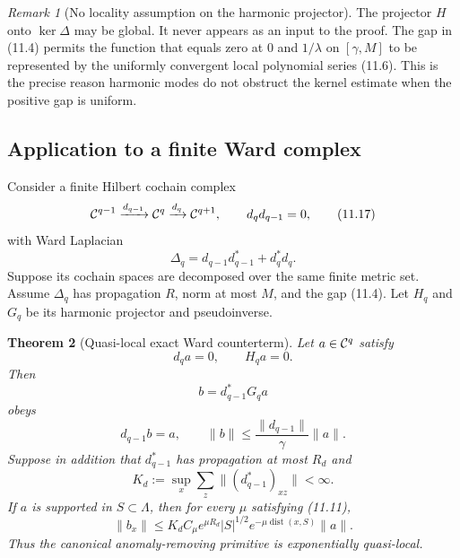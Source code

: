 \documentclass[11pt]{article}
\newtheorem{theorem}{Theorem}[section]
\theoremstyle{remark}
\newtheorem{remark}[theorem]{Remark}
\begin{document}
\begin{remark}[No locality assumption on the harmonic projector]
\label{rem:v12v11-harmonic}
The projector \(H\) onto \(\ker\Delta\) may be global.  It never
appears as an input to the proof.  The gap in (11.4) permits the
function that equals zero at \(0\) and \(1/\lambda\) on
\([\gamma,M]\) to be represented by the uniformly convergent local
polynomial series (11.6).  This is the precise reason harmonic modes
do not obstruct the kernel estimate when the positive gap is
uniform.
\end{remark}

\subsection{Application to a finite Ward complex}

Consider a finite Hilbert cochain complex
\[
 {\cal C}^{q-1}\xrightarrow{d_{q-1}}
 {\cal C}^{q}\xrightarrow{d_q}{\cal C}^{q+1},
 \qquad d_qd_{q-1}=0,                                      \tag{11.17}
\]
with Ward Laplacian
\[
 \Delta_q=d_{q-1}d_{q-1}^*+d_q^*d_q.                       \tag{11.18}
\]
Suppose its cochain spaces are decomposed over the same finite metric
set.  Assume \(\Delta_q\) has propagation \(R\), norm at most \(M\),
and the gap (11.4).  Let \(H_q\) and \(G_q\) be its harmonic
projector and pseudoinverse.

\begin{theorem}[Quasi-local exact Ward counterterm]
\label{thm:v12v11-counterterm}
Let \(a\in{\cal C}^q\) satisfy
\[
                         d_q a=0,\qquad H_q a=0.             \tag{11.19}
\]
Then
\[
                         b=d_{q-1}^*G_q a                   \tag{11.20}
\]
obeys
\[
                         d_{q-1}b=a,\qquad
 \|b\|\le\frac{\|d_{q-1}\|}{\gamma}\|a\|.                  \tag{11.21}
\]
Suppose in addition that \(d_{q-1}^*\) has propagation at most
\(R_d\) and
\[
 K_d:=\sup_x\sum_z
       \|(d_{q-1}^*)_{xz}\|<\infty.                         \tag{11.22}
\]
If \(a\) is supported in \(S\subset\Lambda\), then for every \(\mu\)
satisfying (11.11),
\[
 \boxed{
 \|b_x\|
 \le K_d C_\mu e^{\mu R_d}|S|^{1/2}
      e^{-\mu\operatorname{dist}(x,S)}\|a\|.}               \tag{11.23}
\]
Thus the canonical anomaly-removing primitive is exponentially
quasi-local.
\end{theorem}
\end{document}
